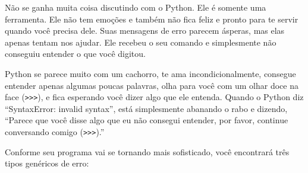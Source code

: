 
Não se ganha muita coisa discutindo com o Python. Ele é somente uma ferramenta.
Ele não tem emoções e também não fica feliz e pronto para te servir quando você 
precisa dele. Suas mensagens de erro parecem ásperas, mas elas apenas tentam nos 
ajudar. Ele recebeu o seu comando e simplesmente não conseguiu entender
o que você digitou.
%

Python se parece muito com um cachorro, te ama incondicionalmente, consegue 
entender apenas algumas poucas palavras, olha para você com um olhar doce na
face ({\tt >>>}), e fica esperando você dizer algo que ele entenda.
Quando o Python diz ``SyntaxError: invalid syntax'', está simplesmente
abanando o rabo e dizendo, ``Parece que você disse algo que eu não consegui 
entender, por favor, continue conversando comigo ({\tt >>>}).''
%

Conforme seu programa vai se tornando mais sofisticado, você encontrará três
tipos genéricos de erro:
%

